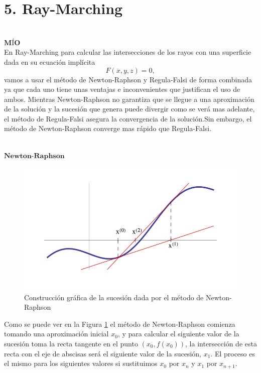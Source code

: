 \chapter*{5. Ray-Marching}

${ }$\\
$\textbf{MÍO}$
${ }$\\

En Ray-Marching para calcular las intersecciones de los rayos con una superficie dada en su ecuación implícita
\[
	F(x,y,z) = 0,
\]
vamos a usar el método de Newton-Raphson y Regula-Falsi de forma combinada ya que cada uno tiene unas ventajas e inconvenientes que justifican el uso de ambos. Mientras Newton-Raphson no garantiza que se llegue a una aproximación de la solución y la sucesión que genera puede divergir como se verá mas adelante, el método de Regula-Falsi asegura la convergencia de la solución.Sin embargo, el método de Newton-Raphson converge mas rápido que Regula-Falsi.


${ }$\\
$\textbf{Newton-Raphson}$
${ }$\\

\begin{figure}
	\begin{center}
		\includegraphics[width=1.0\textwidth]{imagenes/newton.png}
	\end{center}
	\caption{Construcción gráfica de la sucesión dada por el método de Newton-Raphson}
	\label{fig:etiq_7}
\end{figure}

Como se puede ver en la Figura \ref{fig:etiq_7} el método de Newton-Raphson comienza tomando una aproximación inicial $x_0$, y para calcular el siguiente valor de la sucesión toma la recta tangente en el punto $(x_0, f(x_0))$, la intersección de esta recta con el eje de abscisas será el siguiente valor de la sucesión, $x_1$. El proceso es el mismo para los siguientes valores si sustituimos $x_0$ por $x_n$ y $x_1$ por $x_{n+1}$.
${ }$\\

